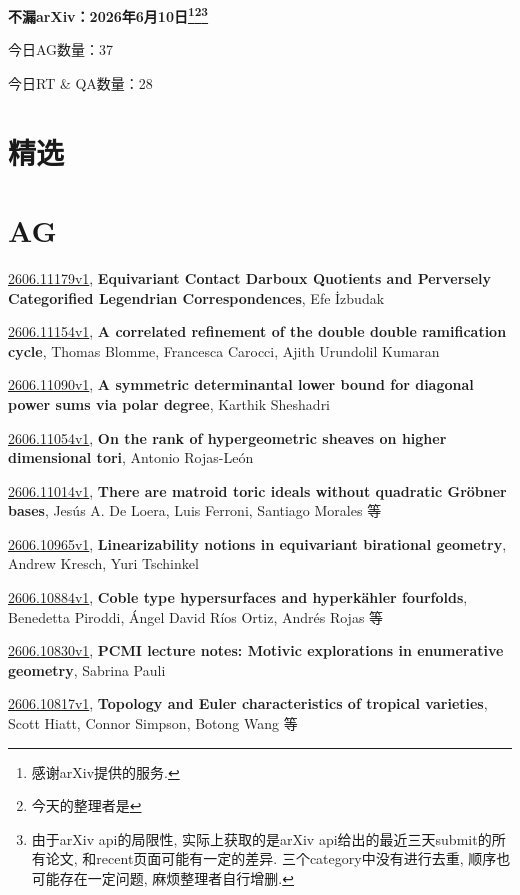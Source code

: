 \documentclass[9pt, a4paper]{article}
\theoremstyle{plain}
\theoremstyle{definition}
\theoremstyle{remark}
\newcommand{\arxiv}[3]{\href{https://arxiv.org/abs/#1}{#1}, \textbf{\textcolor{arxivblue}{#2}}, #3}
\newcommand{\AGnumber}{37}
\newcommand{\RTQAnumber}{28}
\newcommand{\NewestDate}{2026年6月10日}
\newcommand{\todayarXiver}{} %
\begin{document}
\begin{center}
    \Huge\textbf{不漏arXiv：\NewestDate\footnote{感谢arXiv提供的服务.}\footnote{今天的整理者是\todayarXiver}\footnote{由于arXiv api的局限性, 实际上获取的是arXiv api给出的最近三天submit的所有论文, 和recent页面可能有一定的差异. 三个category中没有进行去重, 顺序也可能存在一定问题, 麻烦整理者自行增删.}} \\
\end{center}

\setcounter{section}{-1}

\begin{center}
    今日AG数量：\AGnumber
    
    今日RT \& QA数量：\RTQAnumber
    
\end{center}


\section{精选}


\section{AG}
\arxiv{2606.11179v1}{Equivariant Contact Darboux Quotients and Perversely Categorified Legendrian Correspondences}{Efe İzbudak}

\arxiv{2606.11154v1}{A correlated refinement of the double double ramification cycle}{Thomas Blomme, Francesca Carocci, Ajith Urundolil Kumaran}

\arxiv{2606.11090v1}{A symmetric determinantal lower bound for diagonal power sums via polar degree}{Karthik Sheshadri}

\arxiv{2606.11054v1}{On the rank of hypergeometric sheaves on higher dimensional tori}{Antonio Rojas-León}

\arxiv{2606.11014v1}{There are matroid toric ideals without quadratic Gröbner bases}{Jesús A. De Loera, Luis Ferroni, Santiago Morales 等}

\arxiv{2606.10965v1}{Linearizability notions in equivariant birational geometry}{Andrew Kresch, Yuri Tschinkel}

\arxiv{2606.10884v1}{Coble type hypersurfaces and hyperkähler fourfolds}{Benedetta Piroddi, Ángel David Ríos Ortiz, Andrés Rojas 等}

\arxiv{2606.10830v1}{PCMI lecture notes: Motivic explorations in enumerative geometry}{Sabrina Pauli}

\arxiv{2606.10817v1}{Topology and Euler characteristics of tropical varieties}{Scott Hiatt, Connor Simpson, Botong Wang 等}
\end{document}
